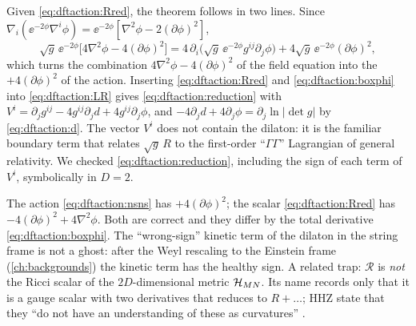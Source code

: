 Given \eqref{eq:dftaction:Rred}, the theorem follows in two lines. Since
$\nabla_i(\ee^{-2\phi}\nabla^i\phi)=\ee^{-2\phi}[\nabla^2\phi-2(\partial\phi)^2]$,
\begin{equation}\label{eq:dftaction:boxphi}
\sqrt g\,\ee^{-2\phi}\bigl[4\nabla^2\phi-4(\partial\phi)^2\bigr]=4\,\partial_i\bigl(\sqrt g\,
\ee^{-2\phi}g^{ij}\partial_j\phi\bigr)+4\sqrt g\,\ee^{-2\phi}(\partial\phi)^2 ,
\end{equation}
which turns the combination $4\nabla^2\phi-4(\partial\phi)^2$ of the field equation into the
$+4(\partial\phi)^2$ of the action. Inserting \eqref{eq:dftaction:Rred} and
\eqref{eq:dftaction:boxphi} into \eqref{eq:dftaction:LR} gives \eqref{eq:dftaction:reduction}
with $V^i=\partial_jg^{ij}-4g^{ij}\partial_jd+4g^{ij}\partial_j\phi$, and
$-4\partial_jd+4\partial_j\phi=\partial_j\ln|\det g|$ by \eqref{eq:dftaction:d}. The vector $V^i$
does not contain the dilaton: it is the familiar boundary term that relates $\sqrt g\,R$ to the
first-order ``$\Gamma\Gamma$'' Lagrangian of general relativity. We checked
\eqref{eq:dftaction:reduction}, including the sign of each term of $V^i$, symbolically in $D=2$.

\begin{pitfallbox}
The action \eqref{eq:dftaction:nsns} has $+4(\partial\phi)^2$; the scalar
\eqref{eq:dftaction:Rred} has $-4(\partial\phi)^2+4\nabla^2\phi$. Both are correct and they
differ by the total derivative \eqref{eq:dftaction:boxphi}. The ``wrong-sign'' kinetic term of
the dilaton in the string frame is not a ghost: after the Weyl rescaling to the Einstein frame
(\cref{ch:backgrounds}) the kinetic term has the healthy sign. A related trap: $\mathcal R$ is
\emph{not} the Ricci scalar of the $2D$-dimensional metric $\mathcal{H}_{MN}$. Its name records only that
it is a gauge scalar with two derivatives that reduces to $R+\dots$; HHZ state that they ``do
not have an understanding of these as curvatures'' .
\end{pitfallbox}

